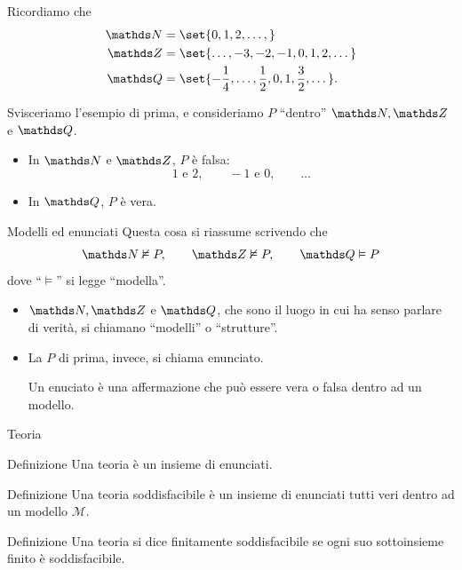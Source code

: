 \documentclass[babel]{beamer}
\begin{document}
\begin{frame}[label={sec:org85d2f9b}]{\null}
Ricordiamo che
\begin{align*}
\N &= \set{0,1,2,\dots,}\\
\Z &= \set{\dots, -3,-2,-1,0,1,2,\dots}\\
\Q &= \set{-\frac{1}{4}, \dots ,\frac{1}{2}, 0, 1, \frac{3}{2}, \dots}.
\end{align*}

Svisceriamo l'esempio di prima, e consideriamo \(P\) ``dentro'' \(\N, \Z\) e \(\Q\).
\begin{itemize}
\item In \(\N\) e \(\Z\), \(P\) è \alert{falsa}:
\begin{equation*}
  1\text{ e } 2,\qquad -1\text{ e } 0, \qquad \dots
\end{equation*}
\item In \(\Q\), \(P\) è \alert{vera}.
\end{itemize}
\end{frame}
\begin{frame}[label={sec:orga2d88ab}]{Modelli ed enunciati}
Questa cosa si riassume scrivendo che
\begin{equation*}
\N \nvDash P,\qquad \Z\nvDash P, \qquad \Q\vDash P
\end{equation*}
dove ``\(\vDash\)'' si legge ``modella''.

\begin{itemize}
\item \(\N, \Z\) e \(\Q\), che sono \alert{il luogo in cui ha senso parlare di verità}, si chiamano ``modelli'' o ``strutture''.
\item La \(P\) di prima, invece, si chiama \alert{enunciato}.

Un enuciato è una affermazione che può essere vera o falsa \alert{dentro ad un modello}.
\end{itemize}
\end{frame}
\begin{frame}[label={sec:org1c92fc1}]{Teoria}
\begin{block}{Definizione}
Una \alert{teoria} è un insieme di enunciati.
\end{block}
\begin{block}{Definizione}
Una \alert{teoria soddisfacibile} è un insieme di enunciati \alert{tutti veri dentro ad un modello \(\mathcal{M}\)}.
\end{block}
\begin{block}{Definizione}
Una teoria si dice \alert{finitamente soddisfacibile} se ogni suo sottoinsieme finito è soddisfacibile.
\end{block}
\end{frame}
\end{document}
